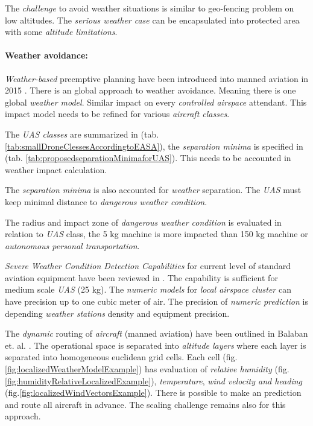 The \emph{challenge} to avoid weather situations is similar to geo-fencing problem on low altitudes. The \emph{serious weather case} can be encapsulated into protected area with some \emph{altitude limitations}.

\paragraph{Weather avoidance:} \emph{Weather-based} preemptive planning have been introduced into manned aviation in 2015 \cite{yamashita2015climate}. There is an  global approach to weather avoidance. Meaning there is one global \emph{weather model}. Similar impact on every \emph{controlled airspace} attendant. This impact model needs to be refined for various \emph{aircraft classes}.  

\begin{note}
    The \emph{UAS classes} are summarized in (tab. \ref{tab:smallDroneClessesAccordingtoEASA}), the \emph{separation minima} is specified in (tab. \ref{tab:proposedseparationMinimaforUAS}). This needs to be accounted in weather impact calculation. 
    
    The \emph{separation minima} is also accounted for \emph{weather} separation. The \emph{UAS} must keep minimal distance to \emph{dangerous weather condition}.
    
    The radius and impact zone of \emph{dangerous weather condition} is evaluated in relation to \emph{UAS} class, the 5 kg machine is more impacted than 150 kg machine or \emph{autonomous personal transportation}.
\end{note}
    
\emph{Severe Weather Condition Detection Capabilities} for current level of standard aviation equipment have been reviewed in \cite{smith2016multi}. The capability is sufficient for medium scale \emph{UAS} (25 kg). The \emph{numeric models} for \emph{local airspace cluster} can have precision up to one cubic meter of air. The precision of \emph{numeric prediction} is depending \emph{weather stations} density and equipment precision.

The \emph{dynamic} routing of \emph{aircraft} (manned aviation) have been outlined in Balaban et. al. \cite{balaban2017dynamic}. The operational space is separated into \emph{altitude layers} where each layer is separated into homogeneous euclidean grid cells. Each cell (fig. \ref{fig:localizedWeatherModelExample}) has evaluation of \emph{relative humidity} (fig. \ref{fig:humidityRelativeLocalizedExample}), \emph{temperature}, \emph{wind velocity and heading} (fig.\ref{fig:localizedWindVectorsExample}). There is possible to make an prediction and route all aircraft in advance. The scaling challenge remains also for this approach. 

